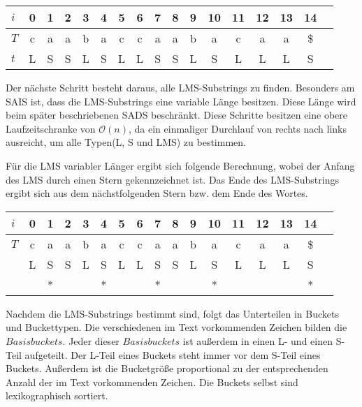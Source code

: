 \begin{center}
  \begin{tabular}{ | l | c | c | c | c | c | c | c | c | c | c | c | c | c | c | c | c | }
    \hline
        $i$ & 0 & 1 & 2 & 3 & 4 & 5 & 6 & 7 & 8 & 9 & 10 & 11 & 12 & 13 & 14 \\ \hline
        $T$ & c & a & a & b & a & c & c & a & a & b & a & c & a & a & \$ \\ \hline
        $t$ & L & S & S & L & S & L & L & S & S & L & S & L & L & L & S \\
    \hline
  \end{tabular}
\end{center}
\bigskip
Der nächste Schritt besteht daraus, alle LMS-Substrings zu finden. Besonders am SAIS ist, dass die LMS-Substrings eine variable Länge besitzen. Diese Länge wird beim später beschriebenen SADS beschränkt. Diese Schritte besitzen eine obere Laufzeitschranke von $\mathcal{O}(n)$, da ein einmaliger Durchlauf von rechts nach links ausreicht, um alle Typen(L, S und LMS) zu bestimmen.

\noindent Für die LMS variabler Länger ergibt sich folgende Berechnung, wobei der Anfang des LMS durch einen Stern gekennzeichnet ist. Das Ende des LMS-Substrings ergibt sich aus dem nächstfolgenden Stern bzw. dem Ende des Wortes.

\begin{center}
  \begin{tabular}{ | l | c | c | c | c | c | c | c | c | c | c | c | c | c | c | c | c | }
    \hline
        $i$ & 0 & 1 & 2 & 3 & 4 & 5 & 6 & 7 & 8 & 9 & 10 & 11 & 12 & 13 & 14 \\ \hline
        $T$ & c & a & a & b & a & c & c & a & a & b & a & c & a & a & \$ \\ \hline
            & L & S & S & L & S & L & L & S & S & L & S & L & L & L & S \\ \hline
            &   & * &   &   & * &   &   & * &   &   & * &   &   &   & * \\
    \hline
  \end{tabular}
\end{center}
\bigskip
Nachdem die LMS-Substrings bestimmt sind, folgt das Unterteilen in Buckets und Buckettypen. Die verschiedenen im Text vorkommenden Zeichen bilden die  $Basisbuckets$. Jeder dieser $Basisbuckets$ ist außerdem in einen L- und einen S-Teil aufgeteilt. Der L-Teil eines Buckets steht immer vor dem S-Teil eines Buckets. Außerdem ist die Bucketgröße proportional zu der entsprechenden Anzahl der im Text vorkommenden Zeichen. Die Buckets selbst sind lexikographisch sortiert.

